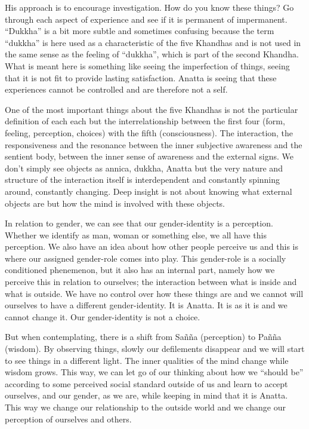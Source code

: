 His approach is to encourage investigation. How do you know these things? Go through each aspect of experience and see if it is permanent of impermanent. “Dukkha” is a bit more subtle and sometimes confusing because the term “dukkha” is here used as a characteristic of the five Khandhas and is not used in the same sense as the feeling of “dukkha”, which is part of the second Khandha. What is meant here is something like seeing the imperfection of things, seeing that it is not fit to provide lasting satisfaction. Anatta is seeing that these experiences cannot be controlled and are therefore not a self.

One of the most important things about the five Khandhas is not the particular definition of each each but the interrelationship between the first four (form, feeling, perception, choices) with the fifth (consciousness). The interaction, the responsiveness and the resonance between the inner subjective awareness and the sentient body, between the inner sense of awareness and the external signs. We don’t simply see objects as annica, dukkha, Anatta but the very nature and structure of the interaction itself is interdependent and constantly spinning around, constantly changing. Deep insight is not about knowing what external objects are but how the mind is involved with these objects.

In relation to gender, we can see that our gender-identity is a perception. Whether we identify as man, woman or something else, we all have this perception. We also have an idea about how other people perceive us and this is where our assigned gender-role comes into play. This gender-role is a socially conditioned phenemenon, but it also has an internal part, namely how we perceive this in relation to ourselves; the interaction between what is inside and what is outside. We have no control over how these things are and we cannot will ourselves to have a different gender-identity. It is Anatta. It is as it is and we cannot change it. Our gender-identity is not a choice.

But when contemplating, there is a shift from Sañña (perception) to Pañña (wisdom). By observing things, slowly our defilements disappear and we will start to see things in a different light. The inner qualities of the mind change while wisdom grows. This way, we can let go of our thinking about how we “should be” according to some perceived social standard outside of us and learn to accept ourselves, and our gender, as we are, while keeping in mind that it is Anatta. This way we change our relationship to the outside world and we change our perception of ourselves and others.